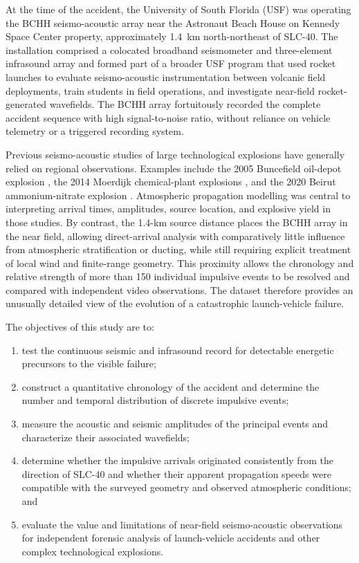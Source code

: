 \documentclass[]{seismica}
\begin{document}
At the time of the accident, the University of South Florida (USF) was
operating the BCHH seismo-acoustic array near the Astronaut Beach House on
Kennedy Space Center property, approximately 1.4~km north-northeast of SLC-40.
The installation comprised a colocated broadband seismometer and three-element
infrasound array and formed part of a broader USF program that used rocket
launches to evaluate seismo-acoustic instrumentation between volcanic field
deployments, train students in field operations, and investigate near-field
rocket-generated wavefields. The BCHH array fortuitously recorded the complete
accident sequence with high signal-to-noise ratio, without reliance on vehicle
telemetry or a triggered recording system.

Previous seismo-acoustic studies of large technological explosions have
generally relied on regional observations. Examples include the 2005 Buncefield
oil-depot explosion \citep{ottemoller_2008,ceranna_2009,green_2008}, the 2014
Moerdijk chemical-plant explosions \citep{smink_2019}, and the 2020 Beirut
ammonium-nitrate explosion \citep{pilger_beirut_2021,kim_pasyanos_2022}.
Atmospheric propagation modelling was central to interpreting arrival times,
amplitudes, source location, and explosive yield in those studies. By contrast,
the 1.4-km source distance places the BCHH array in the near field, allowing
direct-arrival analysis with comparatively little influence from atmospheric
stratification or ducting, while still requiring explicit treatment of local
wind and finite-range geometry. This proximity allows the chronology and
relative strength of more than 150 individual impulsive events to be resolved
and compared with independent video observations. The dataset therefore
provides an unusually detailed view of the evolution of a catastrophic
launch-vehicle failure.

The objectives of this study are to:
\begin{enumerate}
  \item test the continuous seismic and infrasound record for detectable
        energetic precursors to the visible failure;
  \item construct a quantitative chronology of the accident and determine the
        number and temporal distribution of discrete impulsive events;
  \item measure the acoustic and seismic amplitudes of the principal events
        and characterize their associated wavefields;
  \item determine whether the impulsive arrivals originated consistently from
        the direction of SLC-40 and whether their apparent propagation speeds
        were compatible with the surveyed geometry and observed atmospheric
        conditions; and
  \item evaluate the value and limitations of near-field seismo-acoustic
        observations for independent forensic analysis of launch-vehicle
        accidents and other complex technological explosions.
\end{enumerate}
\end{document}
